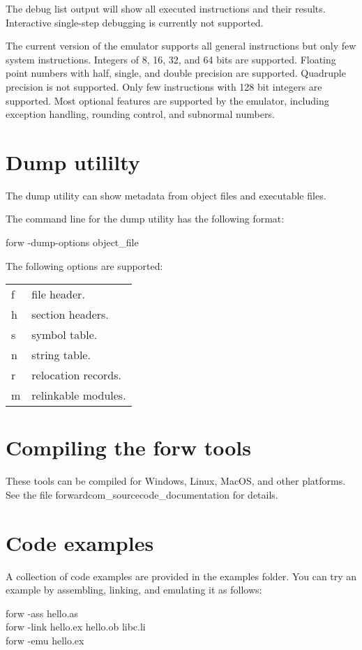 \documentclass[forwardcom.tex]{subfiles}
\begin{document}
The debug list output will show all executed instructions and their results.
Interactive single-step debugging is currently not supported.
\vspace{2mm}

The current version of the emulator supports all general instructions but only few system instructions. Integers of 8, 16, 32, and 64 bits are supported. Floating point numbers with half, single, and double precision are supported. Quadruple precision is not supported. Only few instructions with 128 bit integers are supported. 
Most optional features are supported by the emulator, including exception handling, rounding control, and subnormal numbers.
\vspace{2mm}

\section{Dump utililty} \label{dumpUtililty}

The dump utility can show metadata from object files and executable files.
\vspace{2mm}

The command line for the dump utility has the following format:
\vspace{2mm}

\hspace{5mm} {\ttfamily forw -dump-options object\_file }
\vspace{2mm}

The following options are supported:\\
\begin{tabular}{|p{10mm}p{150mm}|}
\hline
f & file header.\\
h & section headers.\\
s & symbol table.\\
n & string table.\\
r & relocation records.\\
m & relinkable modules.\\
\hline
\end{tabular}
\vspace{2mm}


\section{Compiling the forw tools} \label{compilingForw}
These tools can be compiled for Windows, Linux, MacOS, and other platforms. 
See the file forwardcom\_sourcecode\_documentation for details.
\vspace{2mm}


\section{Code examples} \label{codeExamples}
A collection of code examples are provided in the examples folder. You can try an example by assembling, linking, and emulating it as follows:
\vspace{2mm}

forw -ass hello.as \\
forw -link hello.ex hello.ob libc.li \\
forw -emu hello.ex
\vspace{2mm}
\end{document}
